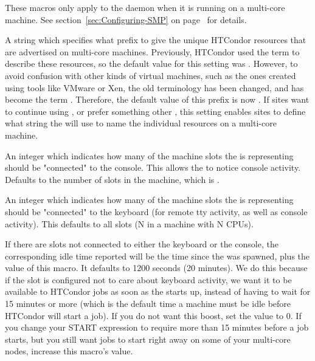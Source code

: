 \begin{description}
\end{description}


These macros only apply to the  daemon when it is running on 
a multi-core machine. 
See section~\ref{sec:Configuring-SMP} on
page~\pageref{sec:Configuring-SMP} for details.

\begin{description}

\label{param:StartdResourcePrefix}
\item[\Macro{STARTD\_RESOURCE\_PREFIX}] 
  A string which specifies what prefix to give the unique HTCondor
  resources that are advertised on multi-core machines.
  Previously, HTCondor used the term  to describe
  these resources, so the default value for this setting was .
  However, to avoid confusion with other kinds of virtual machines,
  such as the ones created using tools like VMware or Xen, the old
   terminology has been changed, and has become
  the term .
  Therefore, the default value of this prefix is now .
  If sites want to continue using , or prefer something other
  , this setting enables sites to define what string the
   will use to name the individual resources on a multi-core
  machine.

\label{param:SlotsConnectedToConsole}
\item[\Macro{SLOTS\_CONNECTED\_TO\_CONSOLE}] 
  An integer which indicates how many of the machine slots
  the  is representing should be "connected" to the
  console.
  This allows the  to notice console activity.
  Defaults to the number of slots in the machine,
  which is .

\label{param:SlotsConnectedToKeyboard}
\item[\Macro{SLOTS\_CONNECTED\_TO\_KEYBOARD}]
  An integer which indicates how many of the machine slots
  the  is representing should be "connected" to the
  keyboard (for remote tty activity, as well as console activity).
  This defaults to all slots (N in a machine with N CPUs).

\label{param:DisconnectedKeyboardIdleBoost}
\item[\Macro{DISCONNECTED\_KEYBOARD\_IDLE\_BOOST}]
  If there are slots not connected to either the keyboard
  or the console, the corresponding idle time reported will be the
  time since the  was spawned, plus the value of this macro.
  It defaults to 1200 seconds (20 minutes). 
  We do this because if the slot is configured not to care
  about keyboard activity, we want it to be available to HTCondor jobs
  as soon as the  starts up, instead of having to wait for 15
  minutes or more (which is the default time a machine must be idle
  before HTCondor will start a job).
  If you do not want this boost, set the value to 0.  
  If you change your START expression to require more than 15 minutes
  before a job starts, but you still want jobs to start right away on
  some of your multi-core nodes, increase this macro's value.


\end{description}
